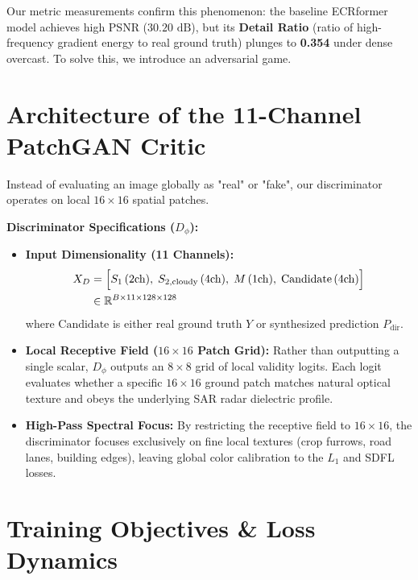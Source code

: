 \documentclass[11pt,a4paper]{article}
\begin{document}
Our metric measurements confirm this phenomenon: the baseline ECRformer model achieves high PSNR ($30.20\text{ dB}$), but its \textbf{Detail Ratio} (ratio of high-frequency gradient energy to real ground truth) plunges to \textbf{0.354} under dense overcast. To solve this, we introduce an adversarial game.

\section{Architecture of the 11-Channel PatchGAN Critic}

Instead of evaluating an image globally as "real" or "fake", our discriminator operates on local $16 \times 16$ spatial patches.

\begin{center}
\begin{tcolorbox}[colback=boxbg,colframe=bordercolor,width=0.98\linewidth]
\textbf{\textcolor{primary}{Discriminator Specifications ($D_\phi$):}}
\begin{itemize}[leftmargin=1.5em, itemsep=0.3em]
    \item \textbf{Input Dimensionality (11 Channels):}
    \begin{align}
    X_D &= \Big[ S_1 \,(2\text{ch}), \; S_{2,\text{cloudy}} \,(4\text{ch}), \; M \,(1\text{ch}), \; \text{Candidate} \,(4\text{ch}) \Big] \notag \\
        &\in \mathbb{R}^{B \times 11 \times 128 \times 128}
    \end{align}
    where $\text{Candidate}$ is either real ground truth $Y$ or synthesized prediction $P_{\text{dir}}$.
    \item \textbf{Local Receptive Field ($16 \times 16$ Patch Grid):} Rather than outputting a single scalar, $D_\phi$ outputs an $8 \times 8$ grid of local validity logits. Each logit evaluates whether a specific $16 \times 16$ ground patch matches natural optical texture and obeys the underlying SAR radar dielectric profile.
    \item \textbf{High-Pass Spectral Focus:} By restricting the receptive field to $16 \times 16$, the discriminator focuses exclusively on fine local textures (crop furrows, road lanes, building edges), leaving global color calibration to the $L_1$ and SDFL losses.
\end{itemize}
\end{tcolorbox}
\end{center}

\newpage

\section{Training Objectives \& Loss Dynamics}
\end{document}
